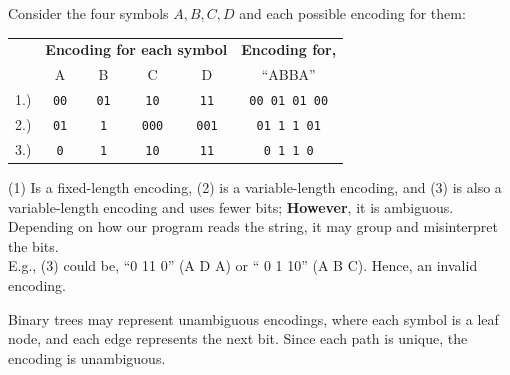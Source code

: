 \newpage 

\begin{Example}

    \label{ex:encoding_four}

    Consider the four symbols $A, B, C, D$ and each possible encoding for them:\\

    \noindent
    \begin{center}
   
  \begin{tabular}{c c c c c c}
    \toprule
    & \multicolumn{4}{c}{\textbf{Encoding for each symbol}} & \textbf{Encoding for,} \\
    &A & B & C & D & ``ABBA'' \\
    \midrule
    1.)&\texttt{00} & \texttt{01}  & \texttt{10}  & \texttt{11}  & \texttt{00 01 01 00} \\
    2.)&\texttt{01} & \texttt{1}   & \texttt{000} & \texttt{001} & \texttt{01 1 1 01}  \\
    3.)&\texttt{0}  & \texttt{1}   & \texttt{10}  & \texttt{11}  & \texttt{0 1 1 0}    \\
    \bottomrule
  \end{tabular}

    \end{center}

    \vspace{1em}
  \noindent
  (1) Is a fixed-length encoding, (2) is a variable-length encoding, and (3) is also a variable-length encoding and
  uses fewer bits; \textbf{However}, it is ambiguous. Depending on how our program reads the string, it may group and misinterpret 
  the bits.\\

  \noindent
  E.g., (3) could be, ``0 11 0'' (A D A) or `` 0 1 10'' (A B C). Hence, an invalid encoding.
\end{Example}

\begin{theo}

    \label{theo:binary_tree_encoding}

    Binary trees may represent unambiguous encodings, where each symbol is a leaf 
    node, and each edge represents the next bit. Since each path is unique, the encoding is unambiguous.
\end{theo}

